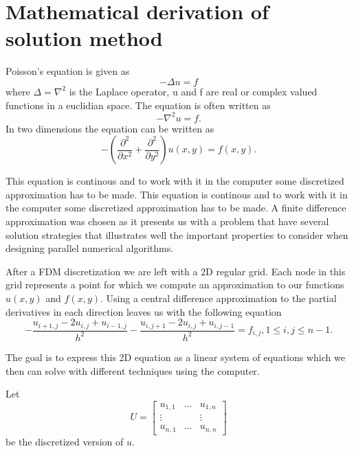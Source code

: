 \documentclass{article}
\begin{document}
\section{Mathematical derivation of solution method}
\label{sec:math_der}
Poisson's equation is given as
\[
-\Delta u = f
\]
where $\Delta = \nabla^2$ is the Laplace operator, u and f are real or complex valued functions in a
euclidian space. The equation is often written as
\[
-\nabla^2 u = f.
\]
In two dimensions the equation can be written as
\[
-\left( \frac{\partial^2}{\partial x^2} + \frac{\partial^2}{\partial y^2} \right) u(x,y) = f(x,y).
\]

This equation is continous and to work with it in the computer some discretized approximation has
to be made. This equation is continous and to work with it in the computer some discretized approximation has to be made. A finite difference approximation was chosen as it presents us with a
problem that have several solution strategies that illustrates well the important properties to
consider when designing parallel numerical algorithms.

After a FDM discretization we are left with a 2D regular grid. Each node in this grid represents
a point for which we compute an approximation to our functions $u(x,y)$ and $f(x,y)$.
Using a central difference approximation to the partial derivatives in each direction leaves us
with the following equation
\[
-\frac{u_{i+1,j}-2u_{i,j}+u_{i-1,j}}{h^2} - \frac{u_{i,j+1}-2u_{i,j}+u_{i,j-1}}{h^2} = f_{i,j}, 1\leq i,j \leq n-1.
\]

The goal is to express this 2D equation as a linear system of equations which we then can solve with
different techniques using the computer.

Let
\begin{equation}
       U = \begin{bmatrix}
               u_{1,1} & \dots & u_{1,n} \\
               \vdots  &       & \vdots \\
               u_{n,1} & \dots & u_{n,n}
       \end{bmatrix}
\end{equation}
be the discretized version of $u$.
\end{document}
